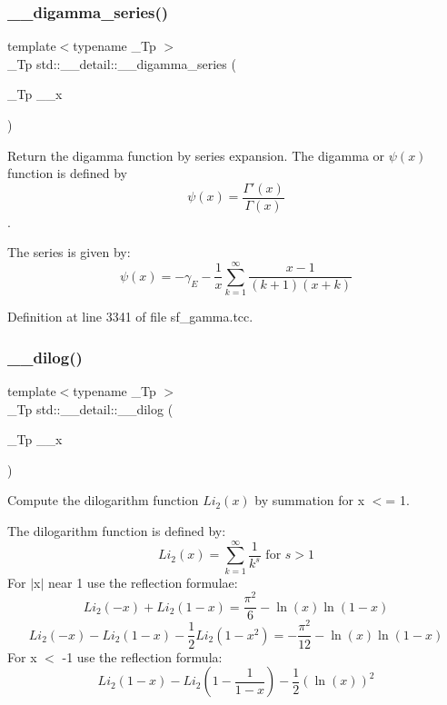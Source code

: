 \subsubsection{\texorpdfstring{\+\_\+\+\_\+digamma\+\_\+series()}{\_\_digamma\_series()}}
{\footnotesize\ttfamily template$<$typename \+\_\+\+Tp $>$ \\
\+\_\+\+Tp std\+::\+\_\+\+\_\+detail\+::\+\_\+\+\_\+digamma\+\_\+series (\begin{DoxyParamCaption}\item[{\+\_\+\+Tp}]{\+\_\+\+\_\+x }\end{DoxyParamCaption})}



Return the digamma function by series expansion. The digamma or $ \psi(x) $ function is defined by \[ \psi(x) = \frac{\Gamma'(x)}{\Gamma(x)} \]. 

The series is given by\+: \[ \psi(x) = -\gamma_E - \frac{1}{x} \sum_{k=1}^{\infty} \frac{x - 1}{(k + 1)(x + k)} \] 

Definition at line 3341 of file sf\+\_\+gamma.\+tcc.

\mbox{\label{namespacestd_1_1____detail_a5083a0c9fce3299593ca22e7dbaeaf19}} 
\subsubsection{\texorpdfstring{\+\_\+\+\_\+dilog()}{\_\_dilog()}}
{\footnotesize\ttfamily template$<$typename \+\_\+\+Tp $>$ \\
\+\_\+\+Tp std\+::\+\_\+\+\_\+detail\+::\+\_\+\+\_\+dilog (\begin{DoxyParamCaption}\item[{\+\_\+\+Tp}]{\+\_\+\+\_\+x }\end{DoxyParamCaption})}



Compute the dilogarithm function $ Li_2(x) $ by summation for x $<$= 1. 

The dilogarithm function is defined by\+: \[ Li_2(x) = \sum_{k=1}^{\infty} \frac{1}{k^{s}} \mbox{ for } s > 1 \] For $\vert$x$\vert$ near 1 use the reflection formulae\+: \[ Li_2(-x) + Li_2(1-x) = \frac{\pi^2}{6} - \ln(x) \ln(1-x) \] \[ Li_2(-x) - Li_2(1-x) - \frac{1}{2}Li_2(1-x^2) = -\frac{\pi^2}{12} - \ln(x) \ln(1-x) \] For x $<$ -\/1 use the reflection formula\+: \[ Li_2(1-x) - Li_2(1-\frac{1}{1-x}) - \frac{1}{2}(\ln(x))^2 \] 

